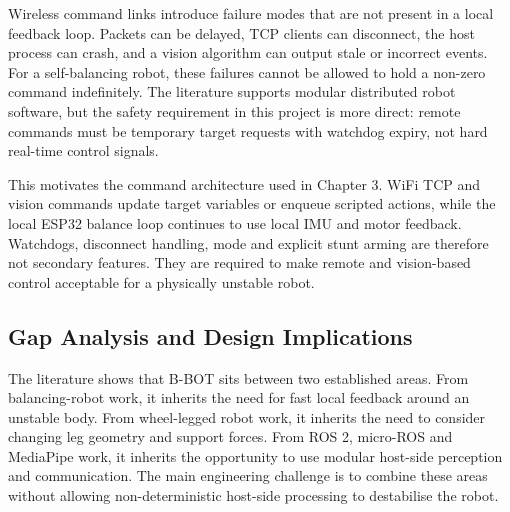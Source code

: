 \documentclass[12pt, a4paper]{article}
\begin{document}
Wireless command links introduce failure modes that are not present in a local feedback loop. Packets can be delayed, TCP clients can disconnect, the host process can crash, and a vision algorithm can output stale or incorrect events. For a self-balancing robot, these failures cannot be allowed to hold a non-zero command indefinitely. The literature supports modular distributed robot software, but the safety requirement in this project is more direct: remote commands must be temporary target requests with watchdog expiry, not hard real-time control signals.

This motivates the command architecture used in Chapter 3. WiFi TCP and vision commands update target variables or enqueue scripted actions, while the local ESP32 balance loop continues to use local IMU and motor feedback. Watchdogs, disconnect handling, \texttt{} mode and explicit stunt arming are therefore not secondary features. They are required to make remote and vision-based control acceptable for a physically unstable robot.

\subsection{Gap Analysis and Design Implications}

The literature shows that B-BOT sits between two established areas. From balancing-robot work, it inherits the need for fast local feedback around an unstable body. From wheel-legged robot work, it inherits the need to consider changing leg geometry and support forces. From ROS 2, micro-ROS and MediaPipe work, it inherits the opportunity to use modular host-side perception and communication. The main engineering challenge is to combine these areas without allowing non-deterministic host-side processing to destabilise the robot.
\end{document}

